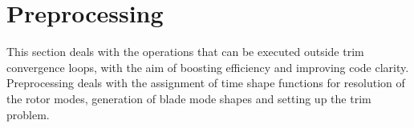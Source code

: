 \section{Preprocessing}
This section deals with the operations that can be executed outside trim convergence loops, with the aim of boosting efficiency and improving code clarity. Preprocessing deals with the assignment of time shape functions for resolution of the rotor modes, generation of blade mode shapes and setting up the trim problem. 
